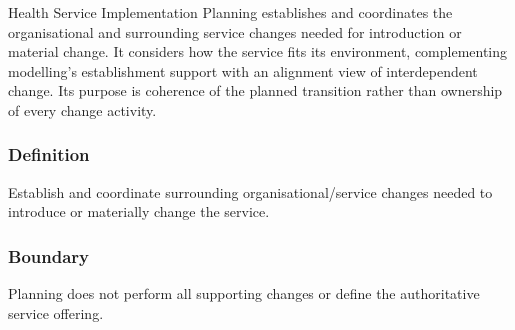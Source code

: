 Health Service Implementation Planning establishes and coordinates the organisational and surrounding service changes needed for introduction or material change. It considers how the service fits its environment, complementing modelling's establishment support with an alignment view of interdependent change. Its purpose is coherence of the planned transition rather than ownership of every change activity.

\subsubsection*{Definition}

Establish and coordinate surrounding organisational/\allowbreak{}service changes needed to introduce or materially change the service.

\subsubsection*{Boundary}

Planning does not perform all supporting changes or define the authoritative service offering.

